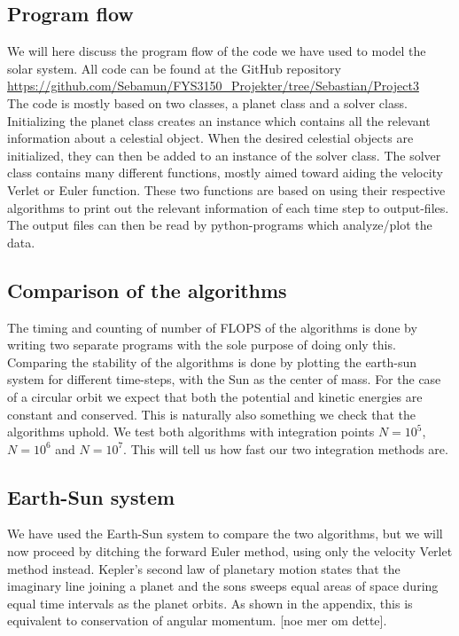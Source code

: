 \documentclass{article}
\begin{document}
\begin{multicols}{2}
\subsection{Program flow}

We will here discuss the program flow of the code we have used to model the solar system. All code can be found at the GitHub repository \\
\url{https://github.com/Sebamun/FYS3150_Projekter/tree/Sebastian/Project3}  \\ The code is mostly based on two classes, a planet class and a solver class. Initializing the planet class creates an instance which contains all the relevant information about a celestial object. When the desired celestial objects are initialized, they can then be added to an instance of the solver class. The solver class contains many different functions, mostly aimed toward aiding the velocity Verlet or Euler function. These two functions are based on using their respective algorithms to print out the relevant information of each time step to output-files. The output files can then be read by python-programs which analyze/plot the data.

\subsection{Comparison of the algorithms}
The timing and counting of number of FLOPS of the algorithms is done by writing two separate programs with the sole purpose of doing only this. Comparing the stability of the algorithms is done by plotting the earth-sun system for different time-steps, with the Sun as the center of mass. For the case of a circular orbit we expect that both the potential and kinetic energies are constant and conserved. This is naturally also something we check that the algorithms uphold. We test both algorithms with integration points $N=10^5$, $N=10^6$ and $N=10^7$. This will tell us how fast our two integration methods are. 

\subsection{Earth-Sun system}
We have used the Earth-Sun system to compare the two algorithms, but we will now proceed by ditching the forward Euler method, using only the velocity Verlet method instead. Kepler's second law of planetary motion states that the imaginary line joining a planet and the sons sweeps equal areas of space during equal time intervals as the planet orbits. As shown in the appendix, this is equivalent to conservation of angular momentum. [noe mer om dette]. 


\end{multicols}
\end{document}
